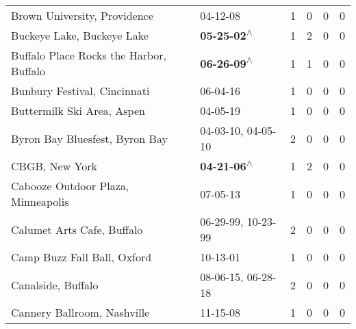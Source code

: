 \begin{supertabular}{p{0.4\textwidth}p{0.3\textwidth}p{0.05\textwidth}p{0.05\textwidth}p{0.05\textwidth}p{0.05\textwidth}}
                                                 Brown University, Providence &                                                                  04-12-08\textsuperscript{} &  1 &  0 &  0 &  0 \\
                                                   Buckeye Lake, Buckeye Lake &                                                 \textbf{05-25-02\textsuperscript{$\wedge$}} &  1 &  2 &  0 &  0 \\
                                      Buffalo Place Rocks the Harbor, Buffalo &                                                 \textbf{06-26-09\textsuperscript{$\wedge$}} &  1 &  1 &  0 &  0 \\
                                                 Bunbury Festival, Cincinnati &                                                                  06-04-16\textsuperscript{} &  1 &  0 &  0 &  0 \\
                                                   Buttermilk Ski Area, Aspen &                                                                  04-05-19\textsuperscript{} &  1 &  0 &  0 &  0 \\
                                               Byron Bay Bluesfest, Byron Bay &                                      04-03-10\textsuperscript{}, 04-05-10\textsuperscript{} &  2 &  0 &  0 &  0 \\
                                                               CBGB, New York &                                                 \textbf{04-21-06\textsuperscript{$\wedge$}} &  1 &  2 &  0 &  0 \\
                                           Cabooze Outdoor Plaza, Minneapolis &                                                                  07-05-13\textsuperscript{} &  1 &  0 &  0 &  0 \\
                                                   Calumet Arts Cafe, Buffalo &                                      06-29-99\textsuperscript{}, 10-23-99\textsuperscript{} &  2 &  0 &  0 &  0 \\
                                                  Camp Buzz Fall Ball, Oxford &                                                                  10-13-01\textsuperscript{} &  1 &  0 &  0 &  0 \\
                                                           Canalside, Buffalo &                                      08-06-15\textsuperscript{}, 06-28-18\textsuperscript{} &  2 &  0 &  0 &  0 \\
                                                  Cannery Ballroom, Nashville &                                                                  11-15-08\textsuperscript{} &  1 &  0 &  0 &  0 \\

\end{supertabular}
